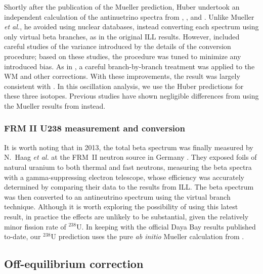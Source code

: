 \documentclass[../thesis.tex]{subfiles}
\begin{document}
Shortly after the publication of the Mueller prediction, Huber undertook an independent calculation of the antinuetrino spectra from \urfive, \punine, and \puone \cite{PhysRevC.84.024617}. Unlike Mueller \emph{et al.}, he avoided using nuclear databases, instead converting each spectrum using only virtual beta branches, as in the original ILL results. However, \cite{PhysRevC.84.024617} included careful studies of the variance introduced by the details of the conversion procedure; based on these studies, the procedure was tuned to minimize any introduced bias. As in \cite{PhysRevC.83.054615}, a careful branch-by-branch treatment was applied to the WM and other corrections. With these improvements, the result was largely consistent with \cite{PhysRevC.83.054615}. In this oscillation analysis, we use the Huber predictions for these three isotopes. Previous studies have shown negligible differences from using the Mueller results from \cite{PhysRevC.83.054615} instead.

\subsubsection{FRM II U238 measurement and conversion}
\label{sec:u238conv}

It is worth noting that in 2013, the \ureight total beta spectrum was finally measured by N.~Haag \emph{et al.} at the FRM~II neutron source in Germany \cite{PhysRevLett.112.122501}. They exposed foils of natural uranium to both thermal and fast neutrons, measuring the beta spectra with a gamma-suppressing electron telescope, whose efficiency was accurately determined by comparing their \urfive data to the results from ILL. The beta spectrum was then converted to an antineutrino spectrum using the virtual branch technique. Although it is worth exploring the possibility of using this latest result, in practice the effects are unlikely to be substantial, given the relatively minor fission rate of $^{238}$U. In keeping with the official Daya Bay results published to-date, our $^{238}$U prediction uses the pure \emph{ab initio} Mueller calculation from \cite{PhysRevC.83.054615}.

\subsection{Off-equilibrium correction}
\label{sec:offeqcorr}
\end{document}
